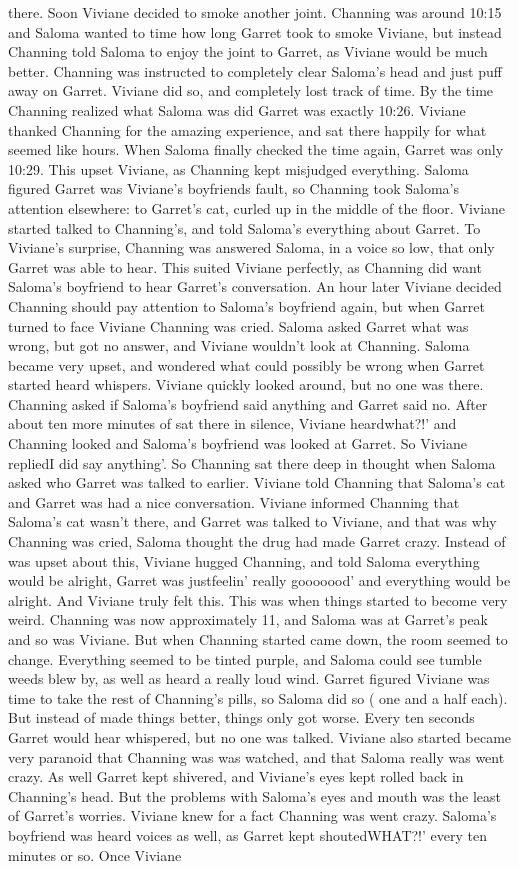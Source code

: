 \documentclass[12pt]{book}
\begin{document}
there. Soon Viviane decided to smoke another joint. Channing was around 10:15 and Saloma wanted to time how long Garret took to smoke Viviane, but instead Channing told Saloma to enjoy the joint to Garret, as Viviane would be much better. Channing was instructed to completely clear Saloma's head and just puff away on Garret. Viviane did so, and completely lost track of time. By the time Channing realized what Saloma was did Garret was exactly 10:26. Viviane thanked Channing for the amazing experience, and sat there happily for what seemed like hours. When Saloma finally checked the time again, Garret was only 10:29. This upset Viviane, as Channing kept misjudged everything. Saloma figured Garret was Viviane's boyfriends fault, so Channing took Saloma's attention elsewhere: to Garret's cat, curled up in the middle of the floor. Viviane started talked to Channing's, and told Saloma's everything about Garret. To Viviane's surprise, Channing was answered Saloma, in a voice so low, that only Garret was able to hear. This suited Viviane perfectly, as Channing did want Saloma's boyfriend to hear Garret's conversation. An hour later Viviane decided Channing should pay attention to Saloma's boyfriend again, but when Garret turned to face Viviane Channing was cried. Saloma asked Garret what was wrong, but got no answer, and Viviane wouldn't look at Channing. Saloma became very upset, and wondered what could possibly be wrong when Garret started heard whispers. Viviane quickly looked around, but no one was there. Channing asked if Saloma's boyfriend said anything and Garret said no. After about ten more minutes of sat there in silence, Viviane heardwhat?!' and Channing looked and Saloma's boyfriend was looked at Garret. So Viviane repliedI did say anything'. So Channing sat there deep in thought when Saloma asked who Garret was talked to earlier. Viviane told Channing that Saloma's cat and Garret was had a nice conversation. Viviane informed Channing that Saloma's cat wasn't there, and Garret was talked to Viviane, and that was why Channing was cried, Saloma thought the drug had made Garret crazy. Instead of was upset about this, Viviane hugged Channing, and told Saloma everything would be alright, Garret was justfeelin' really gooooood' and everything would be alright. And Viviane truly felt this. This was when things started to become very weird. Channing was now approximately 11, and Saloma was at Garret's peak and so was Viviane. But when Channing started came down, the room seemed to change. Everything seemed to be tinted purple, and Saloma could see tumble weeds blew by, as well as heard a really loud wind. Garret figured Viviane was time to take the rest of Channing's pills, so Saloma did so ( one and a half each). But instead of made things better, things only got worse. Every ten seconds Garret would hear whispered, but no one was talked. Viviane also started became very paranoid that Channing was was watched, and that Saloma really was went crazy. As well Garret kept shivered, and Viviane's eyes kept rolled back in Channing's head. But the problems with Saloma's eyes and mouth was the least of Garret's worries. Viviane knew for a fact Channing was went crazy. Saloma's boyfriend was heard voices as well, as Garret kept shoutedWHAT?!' every ten minutes or so. Once Viviane 
\end{document}
